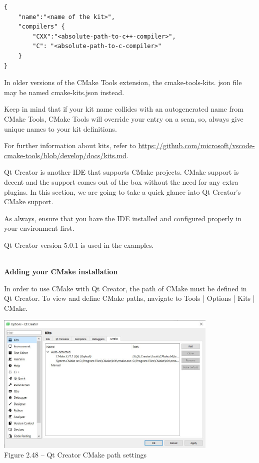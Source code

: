\begin{lstlisting}[style=styleCMake]
{
	"name":"<name of the kit>",
	"compilers" {
		"CXX":"<absolute-path-to-c++-compiler>",
		"C": "<absolute-path-to-c-compiler>"
	}
}
\end{lstlisting}

\begin{tcolorbox}[colback=webgreen!5!white,colframe=webgreen!75!black,title=Note]
In older versions of the CMake Tools extension, the cmake-tools-kits.
json file may be named cmake-kits.json instead.
\end{tcolorbox}

Keep in mind that if your kit name collides with an autogenerated name from CMake Tools, CMake Tools will override your entry on a scan, so, always give unique names to your kit definitions.

For further information about kits, refer to \url{https://github.com/microsoft/vscode-cmake-tools/blob/develop/docs/kits.md}.


Qt Creator is another IDE that supports CMake projects. CMake support is decent and the support comes out of the box without the need for any extra plugins. In this section, we are going to take a quick glance into Qt Creator's CMake support.

As always, ensure that you have the IDE installed and configured properly in your
environment first.

Qt Creator version 5.0.1 is used in the examples.

\hspace*{\fill} \\ %
\noindent
\textbf{Adding your CMake installation}

In order to use CMake with Qt Creator, the path of CMake must be defined in Qt Creator. To view and define CMake paths, navigate to Tools | Options | Kits | CMake.

\begin{center}
\includegraphics[width=0.8\textwidth]{content/1/chapter2/images/48.jpg}\\
Figure 2.48 – Qt Creator CMake path settings
\end{center}

